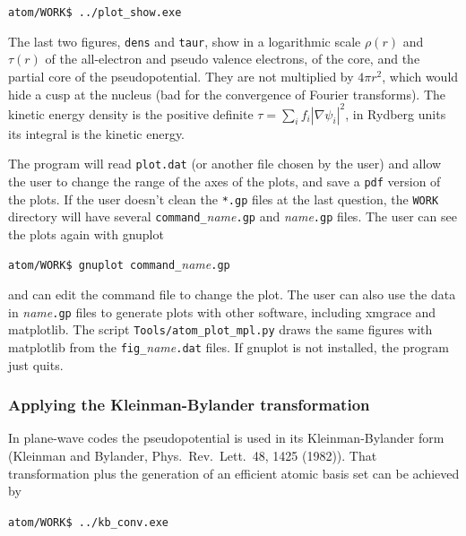 \documentclass[11pt]{article}
\begin{document}
\noindent\texttt{atom/WORK\$ ../plot{\_}show.exe}

The last two figures, \texttt{dens} and \texttt{taur}, show in a logarithmic scale
$\rho(r)$ and $\tau(r)$ of the all-electron and pseudo valence electrons,
of the core, and the partial core of the pseudopotential.  They are not multiplied by $4 \pi r^2$,
which would hide a cusp at the nucleus (bad for the convergence of Fourier transforms).
The kinetic energy density is the positive definite $\tau = \sum_i f_i |\nabla \psi_i|^2$,
in Rydberg units its integral is the kinetic energy.

The program will read \texttt{plot.dat} (or another file chosen by the user) and allow
the user to change the range of the axes of the plots, and save a \texttt{pdf} version of
the plots.  If the user doesn't clean the \texttt{*.gp} files at the last question,
the \texttt{WORK} directory will have several \texttt{command{\_}}\textit{name}\texttt{.gp} and
\textit{name}\texttt{.gp} files.  The user can see the plots again with gnuplot

\noindent\texttt{atom/WORK\$ gnuplot command{\_}}\textit{name}\texttt{.gp}

and can edit the command file to change the plot.  The user can also use the data in \textit{name}\texttt{.gp} files
to generate plots with other software, including xmgrace and matplotlib.
The script \texttt{Tools/atom\_plot\_mpl.py} draws the same figures with matplotlib
from the \texttt{fig\_}\textit{name}\texttt{.dat} files.
If gnuplot is not installed, the program just quits.


\subsubsection{Applying the Kleinman-Bylander transformation}
\label{sec:run-KB}

In plane-wave codes the pseudopotential is used in its Kleinman-Bylander form
(Kleinman and Bylander, Phys.\ Rev.\ Lett.\ 48, 1425 (1982)).  That transformation
plus the generation of an efficient atomic basis set can be achieved by

\noindent\texttt{atom/WORK\$ ../kb{\_}conv.exe}
\end{document}

